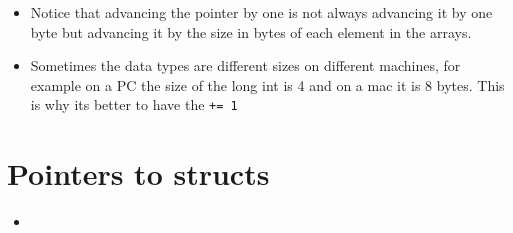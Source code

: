 \begin{itemize}
\begin{verbatim}
                return 0;
            }
            /*
            Output:
            sizes are: int 4; float 4; double 8; long long int 8; short int 2; long int 4
            address of a is 000000f5afdff9a0 [2950691232]; value of pa is 000000f5afdff9a4 [2950691236]; value pointed to by pa is 1
            address of b is 000000f5afdff990 [2950691216]; value of pb is 000000f5afdff994 [2950691220]; value pointed to by pb is 1.000000 
            address of c is 000000f5afdff970 [2950691184]; value of pc is 000000f5afdff978 [2950691192]; value pointed to by pc is 1.000000
            address of d is 000000f5afdff950 [2950691152]; value of pd is 000000f5afdff958 [2950691160]; value pointed to by pd is 1        
            address of e is 000000f5afdff948 [2950691144]; value of pe is 000000f5afdff94a [2950691146]; value pointed to by pe is 1
            address of f is 000000f5afdff930 [2950691120]; value of pf is 000000f5afdff934 [2950691124]; value pointed to by pf is 1 
            */
        \end{verbatim}
    
    \item Notice that advancing the pointer by one is not always advancing it by one byte but advancing it by the size in bytes of each element in the arrays.
    \item Sometimes the data types are different sizes on different machines, for example on a PC the size of the long int is 4 and on a mac it is 8 bytes. This is why its better to have the \texttt{+= 1}
\end{itemize}

\section{Pointers to structs}
\begin{itemize}
    \item 
\end{itemize}